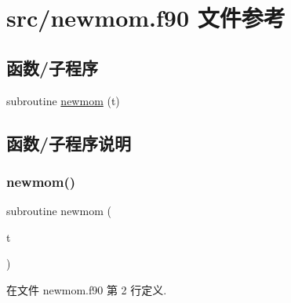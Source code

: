 \hypertarget{newmom_8f90}{}\section{src/newmom.f90 文件参考}
\label{newmom_8f90}
\subsection*{函数/子程序}
\begin{DoxyCompactItemize}
\item 
subroutine \mbox{\hyperlink{newmom_8f90_af6c0ed23d77e1a3dccb9a107c86fd585}{newmom}} (t)
\end{DoxyCompactItemize}


\subsection{函数/子程序说明}
\mbox{\label{newmom_8f90_af6c0ed23d77e1a3dccb9a107c86fd585}} 
\subsubsection{\texorpdfstring{newmom()}{newmom()}}
{\footnotesize\ttfamily subroutine newmom (\begin{DoxyParamCaption}\item[{}]{t }\end{DoxyParamCaption})}



在文件 newmom.\+f90 第 2 行定义.

